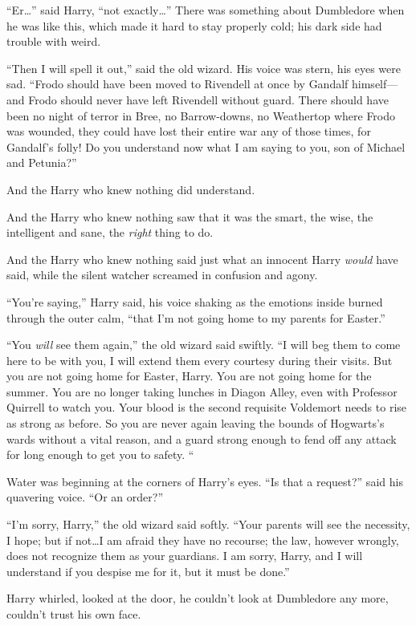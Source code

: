 “Er…” said Harry, “not exactly…” There was something about
Dumbledore when he was like this, which made it hard to stay properly cold; his
dark side had trouble with weird.

“Then I will spell it out,” said the old wizard. His voice was stern, his eyes
were sad. “Frodo should have been moved to Rivendell at once by Gandalf
himself—and Frodo should never have left Rivendell without guard. There
should have been no night of terror in Bree, no Barrow-downs, no Weathertop
where Frodo was wounded, they could have lost their entire war any of those
times, for Gandalf’s folly! Do you understand now what I am saying to you, son
of Michael and Petunia?”

And the Harry who knew nothing did understand.

And the Harry who knew nothing saw that it was the smart, the wise, the
intelligent and sane, the \emph{right} thing to do.

And the Harry who knew nothing said just what an innocent Harry \emph{would}
have said, while the silent watcher screamed in confusion and agony.

“You’re saying,” Harry said, his voice shaking as the emotions inside burned
through the outer calm, “that I’m not going home to my parents for Easter.”

“You \emph{will} see them again,” the old wizard said swiftly. “I will beg them
to come here to be with you, I will extend them every courtesy during their
visits. But you are not going home for Easter, Harry. You are not going home
for the summer. You are no longer taking lunches in Diagon Alley, even with
Professor Quirrell to watch you. Your blood is the second requisite Voldemort
needs to rise as strong as before. So you are never again leaving the bounds of
Hogwarts’s wards without a vital reason, and a guard strong enough to fend off
any attack for long enough to get you to safety. “

Water was beginning at the corners of Harry’s eyes. “Is that a request?” said
his quavering voice. “Or an order?”

“I’m sorry, Harry,” the old wizard said softly. “Your parents will see the
necessity, I hope; but if not…I am afraid they have no recourse; the
law, however wrongly, does not recognize them as your guardians. I am sorry,
Harry, and I will understand if you despise me for it, but it must be done.”

Harry whirled, looked at the door, he couldn’t look at Dumbledore any more,
couldn’t trust his own face.


